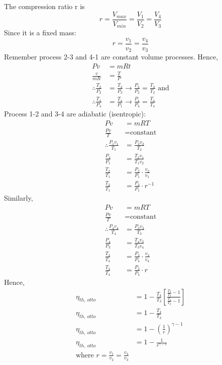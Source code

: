 \documentclass[class=report, crop=false, 12pt,a4paper]{standalone}
\begin{document}
The compression ratio r is
\begin{equation}
  r = \frac{V_{max}}{V_{min}} = \frac{V_1}{V_2} = \frac{V_4}{V_3}
\end{equation}
Since it is a fixed mass:
\begin{equation}
  r = \frac{v_1}{v_2} = \frac{v_4}{v_3}
\end{equation}
Remember process 2-3 and 4-1  are constant volume processes. Hence, 
\begin{align}
  Pv &= mRt\\
  \frac{v}{mR} &= \frac{T}{P}\\
  \therefore \frac{T_2}{P_2} &= \frac{T_3}{P_3} \rightarrow \frac{P_3}{P_2} = \frac{T_3}{T_2} \textrm{ and}\\
  \therefore \frac{T_4}{P_4} &= \frac{T_1}{P_1} \rightarrow \frac{P_1}{P_4} = \frac{T_1}{T_4}
\end{align}
Process 1-2 and 3-4 are adiabatic (isentropic):
\begin{align}
  Pv &= mRT\\
  \frac{Pv}{T} &= \textrm{constant}\\
  \therefore \frac{P_1 v_1}{T_1} &= \frac{P_2 v_2}{T_2}\\
  \frac{P_2}{P_1} &= \frac{T_2 v_1}{T_1 v_2}\\
  \frac{T_2}{T_1} &= \frac{P_2}{P_1} \cdot \frac{v_2}{v_1}\\
  \frac{T_2}{T_1} &= \frac{P_2}{P_1} \cdot r^{-1}
\end{align} 
Similarly,
\begin{align}
  Pv &= mRT\\
  \frac{Pv}{T} &= \textrm{constant}\\
  \therefore \frac{P_4 v_4}{T_4} &= \frac{P_3 v_3}{T_3}\\
  \frac{P_4}{P_3} &= \frac{T_4 v_3}{T_3 v_4}\\
  \frac{T_3}{T_4} &= \frac{P_3}{P_4} \cdot \frac{v_3}{v_4}\\
  \frac{T_3}{T_4} &= \frac{P_3}{P_4} \cdot r
\end{align} 
Hence,
\begin{align}
  \eta_{th, \ otto} &= 1 - \frac{T_4}{T_3}\left[ \frac{\frac{T_3}{T_2}- 1}{\frac{T_3}{T_2} -1} \right]\\
  \eta_{th, \ otto} &= 1 - \frac{T_4}{T_3}\\
  \eta_{th, \ otto} &= 1 - \left( \frac{1}{r} \right)^{\gamma -1}\\
  \eta_{th, \ otto} &= 1 - \frac{1}{r^{\gamma -1}}\\
  \textrm{where } r = \frac{v_1}{v_2} = \frac{v_4}{v_3}
\end{align}
\end{document}
